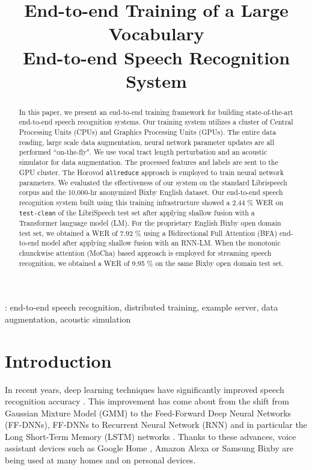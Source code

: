 \documentclass{article}
\title{End-to-end Training of a Large Vocabulary \\ End-to-end Speech Recognition System}
\begin{document}
\ninept
%
\maketitle
%
\begin{abstract}
In this paper, we present an end-to-end training framework for 
building state-of-the-art end-to-end speech recognition systems.
Our training system utilizes a cluster of Central Processing Units 
  (CPUs) and Graphics Processing Units (GPUs).
The entire data reading, large scale data augmentation,
neural network parameter updates are all performed ``on-the-fly". 
  We use vocal tract length perturbation \cite{c_kim_interspeech_2019_00} 
  and an acoustic simulator \cite{c_kim_interspeech_2017_00}
for data augmentation. The processed features and labels are sent 
to the GPU cluster. The Horovod {\tt allreduce} approach is employed to train
neural network parameters.
We evaluated the effectiveness of our system on the standard 
Librispeech corpus \cite{v_panayotov_icassp_2015_00} and 
  the 10,000-hr anonymized Bixby English dataset. 
Our end-to-end speech
recognition system built using this training infrastructure showed 
  a 2.44 \% WER on {\tt test-clean} of the LibriSpeech test set 
 after applying shallow fusion with a Transformer language model (LM).
 For the proprietary English Bixby open domain test set,
we obtained a WER of 7.92 \% using 
a Bidirectional Full Attention (BFA) end-to-end model after applying shallow fusion with an RNN-LM.
When the monotonic chunckwise attention (MoCha) based approach is employed for 
streaming speech recognition, we obtained a WER of 9.95 \% 
  on the same Bixby open domain test set.
\end{abstract}
%
  : end-to-end speech recognition,
distributed training, example server, data augmentation, acoustic simulation
%
%
\section{Introduction}
In recent years, deep learning techniques have significantly 
improved speech recognition accuracy \cite{Seltzer2013DNNAurora4, 
Yu2013FeatureLearningDNN, V_Vanhoucke_Deep_Learning_NIPS_Workshop_2011,
G_Hinton_IEEE_Signal_Process_Mag_2012,
T_Sainath_IEEETran_2017_1}.
This improvement has come about from the shift from Gaussian Mixture Model
(GMM) to the Feed-Forward Deep Neural Networks (FF-DNNs), FF-DNNs
to Recurrent Neural Network (RNN) and in particular the Long Short-Term Memory
(LSTM) networks \cite{S_Hochreiter_neural_computation_1997_00}. 
Thanks to these advances, voice assistant devices such as Google Home
\cite{c_kim_interspeech_2017_00, B_Li_INTERSPEECH_2017_1}
, Amazon Alexa or Samsung Bixby \cite{samsung_bixby} are being used at 
many homes and on personal devices. 
\end{document}
